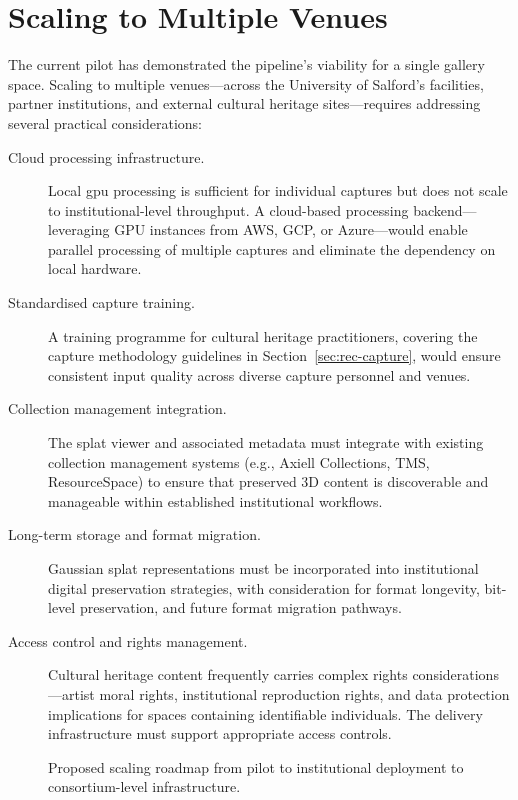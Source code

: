\section{Scaling to Multiple Venues}
\label{sec:fut-scaling}

The current pilot has demonstrated the pipeline's viability for a single gallery space. Scaling to multiple venues---across the University of Salford's facilities, partner institutions, and external cultural heritage sites---requires addressing several practical considerations:

\begin{description}
  \item[Cloud processing infrastructure.] Local \acrshort{gpu} processing is sufficient for individual captures but does not scale to institutional-level throughput. A cloud-based processing backend---leveraging GPU instances from AWS, GCP, or Azure---would enable parallel processing of multiple captures and eliminate the dependency on local hardware.

  \item[Standardised capture training.] A training programme for cultural heritage practitioners, covering the capture methodology guidelines in Section~\ref{sec:rec-capture}, would ensure consistent input quality across diverse capture personnel and venues.

  \item[Collection management integration.] The splat viewer and associated metadata must integrate with existing collection management systems (e.g., Axiell Collections, TMS, ResourceSpace) to ensure that preserved 3D content is discoverable and manageable within established institutional workflows.

  \item[Long-term storage and format migration.] Gaussian splat representations must be incorporated into institutional digital preservation strategies, with consideration for format longevity, bit-level preservation, and future format migration pathways.

  \item[Access control and rights management.] Cultural heritage content frequently carries complex rights considerations---artist moral rights, institutional reproduction rights, and data protection implications for spaces containing identifiable individuals. The delivery infrastructure must support appropriate access controls.
\end{description}

\begin{figure}[htbp]
  \centering
  \caption{Proposed scaling roadmap from pilot to institutional deployment to consortium-level infrastructure.}
  \label{fig:scaling-roadmap}
\end{figure}

